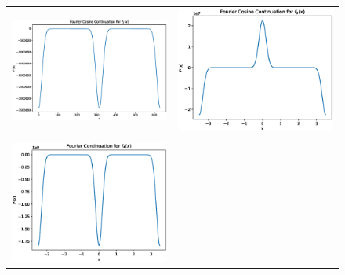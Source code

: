 \documentclass[11pt]{amsart}
\begin{document}
\begin{figure}

\begin{tabular}{|c|c|}
\hline
\includegraphics[scale=.3]{f_2Cosine.eps}
& 
\includegraphics[scale=.4]{f_3Cosine.eps}
\\ \\
\hline
\includegraphics[scale=.4]{f_4Cosine.eps}

\end{tabular}
\end{figure}
\end{document}

